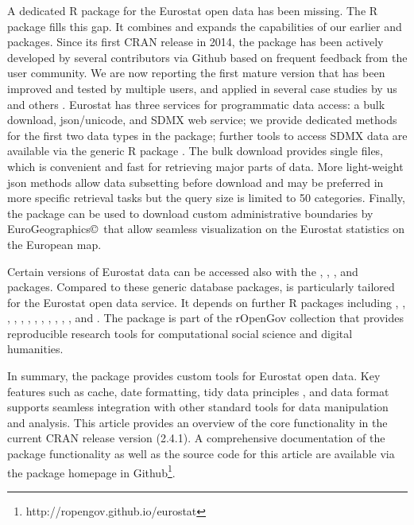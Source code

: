 A dedicated R package for the Eurostat open data has been
missing. The  R package fills this gap. It combines
and expands the capabilities of our earlier  \citep{statfi}
and  \citep{smarterpoland} packages. Since its
first CRAN release in 2014, the  package has been
actively developed by several contributors via Github based on
frequent feedback from the user community. We are now reporting the
first mature version that has been improved and tested by multiple
users, and applied in several case studies by us and others \citep{Kenett2016}. Eurostat has three services for programmatic data access: a bulk download, json/unicode, and SDMX web service; we provide dedicated methods for the first two data types in the  package; further tools to access SDMX data are available via the generic  R package \citep{rsdmx}. The bulk download provides single files, which is convenient and fast for retrieving major parts of data. More light-weight json methods allow data subsetting before download and may be preferred in more specific retrieval tasks but the query size is limited to 50
categories. Finally, the package can be used to download custom
administrative boundaries by EuroGeographics\copyright \ that allow
seamless visualization on the Eurostat statistics on the European map.

Certain versions of Eurostat data can be accessed also with the  \citep{datamart},  \citep{quandl},  \citep{pdfetch}, and  \citep{rsdmx}
packages. Compared to these generic database packages, 
is particularly tailored for the Eurostat open data service. It
depends on further R packages including
 \citep{classInt},
 \citep{dplyr},
 \citep{ggplot2},
 \citep{httr},
 \citep{jsonlite},
 \citep{knitr},
 \citep{mapproj}, 
 \citep{RColorBrewer},
 \citep{readr},
 \citep{sp},
 \citep{stringi},
 \citep{stringr}, and
 \citep{tidyr}. The  package is part of the rOpenGov collection
\citep{Lahti13icml} that provides reproducible research tools for
computational social science and digital humanities.

In summary, the  package provides custom tools 
for Eurostat open data. Key features such as cache, date formatting,
tidy data principles \citep{wickham2014},
and  \citep{tibble} data format supports seamless
integration with other standard tools for data manipulation and
analysis. This article provides an overview of the core functionality
in the current CRAN release version (2.4.1). A comprehensive
documentation of the package functionality as well as the source code
for this article are available via the package homepage in Github\footnote{http://ropengov.github.io/eurostat}.


